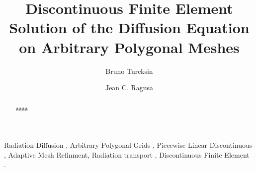 \documentclass[preprint,10pt]{elsarticle}
\renewcommand{\(}{\left(}
\renewcommand{\)}{\right)}
\renewcommand{\[}{\left[}
\renewcommand{\]}{\right]}
\begin{document}
\begin{frontmatter}



\title{Discontinuous Finite Element Solution of the Diffusion Equation on Arbitrary Polygonal Meshes}


\author{Bruno Turcksin }

\address[label1]{Department of Nuclear Engineering, Texas A\&M University 
  College Station, TX 77843, USA }

\author{Jean C. Ragusa}


\begin{abstract}

aaaa

\end{abstract}

\begin{keyword}
  Radiation Diffusion \sep
	Arbitrary Polygonal Grids \sep
  Piecewise Linear Discontinuous \sep
  Adaptive Mesh Refinment\sep
  Radiation transport \sep
  Discontinuous Finite Element \, .
\end{keyword}

\end{frontmatter}
\end{document}

